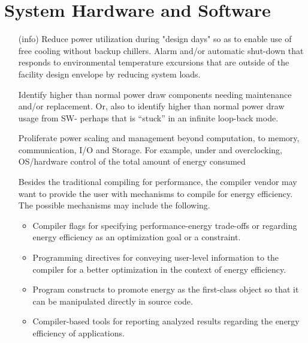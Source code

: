 \section{System Hardware and Software}
\begin{itemize}
\item[(info)]
Reduce power utilization during "design days" so as to enable use of free cooling without backup chillers.  Alarm and/or automatic shut-down that responds to environmental temperature excursions that are outside of the facility design envelope by reducing system loads.  

Identify higher than normal power draw components needing maintenance and/or replacement.   Or, also to identify higher than normal power draw usage from SW- perhaps that is “stuck” in an infinite loop-back mode.     

Proliferate power scaling and management beyond computation, to memory, communication, I/O and Storage.  For example, under and overclocking, OS/hardware control of the total amount of energy consumed 

Besides the traditional compiling for performance, the compiler vendor may want to provide the user with mechanisms to compile for energy efficiency. The possible mechanisms may include the following.

\begin{itemize}
\item
Compiler flags for specifying performance-energy trade-offs or regarding energy efficiency as an optimization goal or a constraint.
\item
Programming directives for conveying user-level information to the compiler for a better optimization in the context of energy efficiency.
\item
Program constructs to promote energy as the first-class object so that it can be manipulated directly in source code.
\item
Compiler-based tools for reporting analyzed results regarding the energy efficiency of applications.     
\end{itemize}
\end{itemize}

